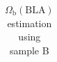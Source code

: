 \begin{table}
\begin{tabular}{ccccccc}

            

            \hline \hline 
        \end{tabular}
    \caption{$\Omega_\text{b}(\text{BLA})$ estimation using sample B}
    \label{tab:Omega_b_sampleB}
\end{table}